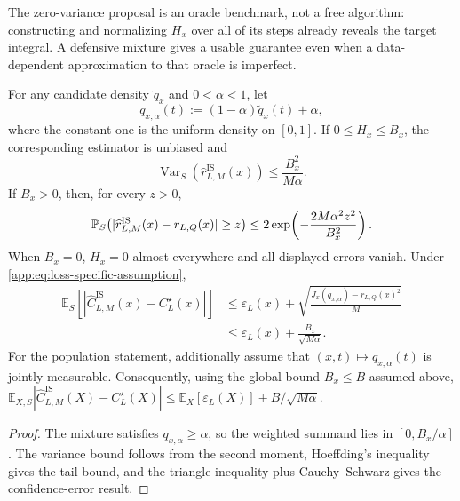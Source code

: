 The zero-variance proposal is an oracle benchmark, not a free algorithm:
constructing and normalizing \(H_x\) over all of its steps already reveals the
target integral. A defensive mixture gives a usable guarantee even when a
data-dependent approximation to that oracle is imperfect.

\begin{corollary}
\label{app:cor:defensive-importance}
For any candidate density \(\widetilde q_x\) and \(0<\alpha<1\), let
\begin{equation*}
  q_{x,\alpha}(t)
  :=(1-\alpha)\widetilde q_x(t)+\alpha,
\end{equation*}
where the constant one is the uniform density on \([0,1]\). If
\(0\leq H_x\leq B_x\), the corresponding estimator is unbiased and
\begin{equation*}
  \operatorname{Var}_S(\widehat r^{\mathrm{IS}}_{L,M}(x))
  \leq \frac{B_x^2}{M\alpha}.
\end{equation*}
If \(B_x>0\), then, for every \(z>0\),
\begin{equation*}
  \mathbb{P}_S\!\left(
    |\widehat r^{\mathrm{IS}}_{L,M}(x)-r_{L,Q}(x)|\geq z
  \right)
  \leq
  2\exp\!\left(-\frac{2M\alpha^2z^2}{B_x^2}\right).
\end{equation*}
When \(B_x=0\), \(H_x=0\) almost everywhere and all displayed errors vanish.
Under \cref{app:eq:loss-specific-assumption},
\begin{align*}
  \mathbb E_S\!\left[
    |\widehat C^{\mathrm{IS}}_{L,M}(x)-C_L^\star(x)|
  \right]
  &\leq
  \varepsilon_L(x)+
  \sqrt{\frac{J_x(q_{x,\alpha})-r_{L,Q}(x)^2}{M}}\\
  &\leq \varepsilon_L(x)+\frac{B_x}{\sqrt{M\alpha}}.
\end{align*}
For the population statement, additionally assume that
$(x,t)\mapsto q_{x,\alpha}(t)$ is jointly measurable. Consequently, using the
global bound \(B_x\leq B\) assumed above,
\(\mathbb E_{X,S}|\widehat C^{\mathrm{IS}}_{L,M}(X)-C_L^\star(X)|
\leq\mathbb E_X[\varepsilon_L(X)]+B/\sqrt{M\alpha}\).
\end{corollary}

\begin{proof}
The mixture satisfies \(q_{x,\alpha}\geq\alpha\), so the weighted summand lies
in \([0,B_x/\alpha]\). The variance bound follows from the second moment,
Hoeffding's inequality gives the tail bound, and the triangle inequality plus
Cauchy--Schwarz gives the confidence-error result.
\end{proof}

